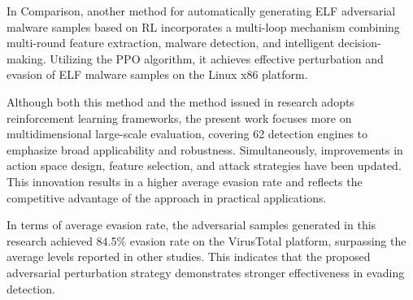 \begin{conclusion}
In Comparison, another method for automatically generating ELF adversarial malware samples based on RL\cite{xue2024reinforcement} incorporates a multi-loop mechanism combining multi-round feature extraction, malware detection, and intelligent decision-making. Utilizing the PPO algorithm, it achieves effective perturbation and evasion of ELF malware samples on the Linux x86 platform.

Although both this method and the method issued in research adopts reinforcement learning frameworks, the present work focuses more on multidimensional large-scale evaluation, covering 62 detection engines to emphasize broad applicability and robustness. Simultaneously, improvements in action space design, feature selection, and attack strategies have been updated. This innovation results in a higher average evasion rate and reflects the competitive advantage of the approach in practical applications.

In terms of average evasion rate, the adversarial samples generated in this research achieved 84.5\% evasion rate on the VirusTotal platform, surpassing the average levels reported in other studies. This indicates that the proposed adversarial perturbation strategy demonstrates stronger effectiveness in evading detection.
\end{conclusion}
